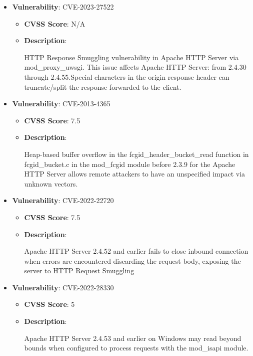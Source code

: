 \documentclass{article}
\begin{document}
\begin{itemize}
        \item \textbf{Vulnerability}: CVE-2023-27522
        \begin{itemize}
            \item \textbf{CVSS Score}:  N/A 
            \item \textbf{Description}:
            \parbox[t]{0.9\linewidth}{
                \ttfamily HTTP Response Smuggling vulnerability in Apache HTTP Server via mod\_proxy\_uwsgi. This issue affects Apache HTTP Server: from 2.4.30 through 2.4.55.Special characters in the origin response header can truncate/split the response forwarded to the client.
            }
        \end{itemize}
    
        \item \textbf{Vulnerability}: CVE-2013-4365
        \begin{itemize}
            \item \textbf{CVSS Score}:  7.5 
            \item \textbf{Description}:
            \parbox[t]{0.9\linewidth}{
                \ttfamily Heap-based buffer overflow in the fcgid\_header\_bucket\_read function in fcgid\_bucket.c in the mod\_fcgid module before 2.3.9 for the Apache HTTP Server allows remote attackers to have an unspecified impact via unknown vectors.
            }
        \end{itemize}
    
        \item \textbf{Vulnerability}: CVE-2022-22720
        \begin{itemize}
            \item \textbf{CVSS Score}:  7.5 
            \item \textbf{Description}:
            \parbox[t]{0.9\linewidth}{
                \ttfamily Apache HTTP Server 2.4.52 and earlier fails to close inbound connection when errors are encountered discarding the request body, exposing the server to HTTP Request Smuggling
            }
        \end{itemize}
    
        \item \textbf{Vulnerability}: CVE-2022-28330
        \begin{itemize}
            \item \textbf{CVSS Score}:  5 
            \item \textbf{Description}:
            \parbox[t]{0.9\linewidth}{
                \ttfamily Apache HTTP Server 2.4.53 and earlier on Windows may read beyond bounds when configured to process requests with the mod\_isapi module.
            }
        \end{itemize}
    

\end{itemize}
\end{document}
